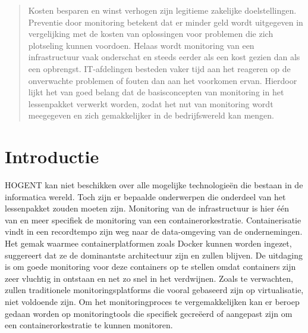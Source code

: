 \documentclass[a0,portrait]{a0poster}
\begin{document}
\begin{multicols}{2} %

\color{HoGentAccent1} %
%
\begin{abstract}
Kosten besparen en winst verhogen zijn legitieme zakelijke doelstellingen. Preventie door monitoring betekent dat er minder geld wordt uitgegeven in vergelijking met de kosten van oplossingen voor problemen die zich plotseling kunnen voordoen. Helaas wordt monitoring van een infrastructuur vaak onderschat en steeds eerder als een kost gezien dan als een opbrengst. IT-afdelingen besteden vaker tijd aan het reageren op de onverwachte problemen of fouten dan aan het voorkomen ervan. Hierdoor lijkt het van goed belang dat de basisconcepten van monitoring in het lessenpakket verwerkt worden, zodat het nut van monitoring wordt meegegeven en zich gemakkelijker in de bedrijfswereld kan mengen.
\end{abstract}

\color{HoGentAccent1} 
\section*{Introductie}
\color{black}
\color{black}

HOGENT kan niet beschikken over alle mogelijke technologieën die bestaan in de informatica wereld. Toch zijn er bepaalde onderwerpen die onderdeel van het lessenpakket zouden moeten zijn. Monitoring van de infrastructuur is hier één van en meer specifiek de monitoring van een containerorkestratie. Containerisatie vindt in een recordtempo zijn weg naar de data-omgeving van de ondernemingen. Het gemak waarmee containerplatformen zoals Docker kunnen worden ingezet, suggereert dat ze de dominantste architectuur zijn en zullen blijven. De uitdaging is om goede monitoring voor deze containers op te stellen omdat containers zijn zeer vluchtig in ontstaan en net zo snel in het verdwijnen. Zoals te verwachten, zullen traditionele monitoringsplatforms die vooral gebaseerd zijn op virtualisatie, niet voldoende zijn. Om het monitoringproces te vergemakkelijken kan er beroep gedaan worden op monitoringtools die specifiek gecreëerd of aangepast zijn om een containerorkestratie te kunnen monitoren.


\end{multicols}
\end{document}
